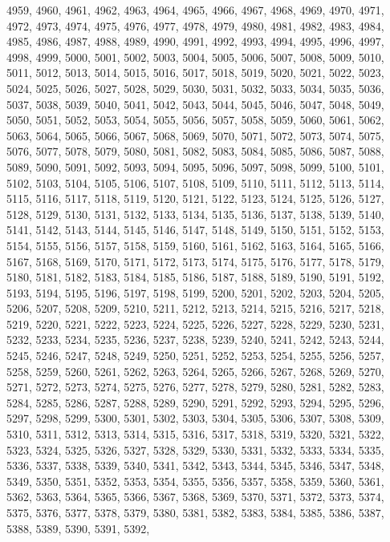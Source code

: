 4959,
4960,
4961,
4962,
4963,
4964,
4965,
4966,
4967,
4968,
4969,
4970,
4971,
4972,
4973,
4974,
4975,
4976,
4977,
4978,
4979,
4980,
4981,
4982,
4983,
4984,
4985,
4986,
4987,
4988,
4989,
4990,
4991,
4992,
4993,
4994,
4995,
4996,
4997,
4998,
4999,
5000,
5001,
5002,
5003,
5004,
5005,
5006,
5007,
5008,
5009,
5010,
5011,
5012,
5013,
5014,
5015,
5016,
5017,
5018,
5019,
5020,
5021,
5022,
5023,
5024,
5025,
5026,
5027,
5028,
5029,
5030,
5031,
5032,
5033,
5034,
5035,
5036,
5037,
5038,
5039,
5040,
5041,
5042,
5043,
5044,
5045,
5046,
5047,
5048,
5049,
5050,
5051,
5052,
5053,
5054,
5055,
5056,
5057,
5058,
5059,
5060,
5061,
5062,
5063,
5064,
5065,
5066,
5067,
5068,
5069,
5070,
5071,
5072,
5073,
5074,
5075,
5076,
5077,
5078,
5079,
5080,
5081,
5082,
5083,
5084,
5085,
5086,
5087,
5088,
5089,
5090,
5091,
5092,
5093,
5094,
5095,
5096,
5097,
5098,
5099,
5100,
5101,
5102,
5103,
5104,
5105,
5106,
5107,
5108,
5109,
5110,
5111,
5112,
5113,
5114,
5115,
5116,
5117,
5118,
5119,
5120,
5121,
5122,
5123,
5124,
5125,
5126,
5127,
5128,
5129,
5130,
5131,
5132,
5133,
5134,
5135,
5136,
5137,
5138,
5139,
5140,
5141,
5142,
5143,
5144,
5145,
5146,
5147,
5148,
5149,
5150,
5151,
5152,
5153,
5154,
5155,
5156,
5157,
5158,
5159,
5160,
5161,
5162,
5163,
5164,
5165,
5166,
5167,
5168,
5169,
5170,
5171,
5172,
5173,
5174,
5175,
5176,
5177,
5178,
5179,
5180,
5181,
5182,
5183,
5184,
5185,
5186,
5187,
5188,
5189,
5190,
5191,
5192,
5193,
5194,
5195,
5196,
5197,
5198,
5199,
5200,
5201,
5202,
5203,
5204,
5205,
5206,
5207,
5208,
5209,
5210,
5211,
5212,
5213,
5214,
5215,
5216,
5217,
5218,
5219,
5220,
5221,
5222,
5223,
5224,
5225,
5226,
5227,
5228,
5229,
5230,
5231,
5232,
5233,
5234,
5235,
5236,
5237,
5238,
5239,
5240,
5241,
5242,
5243,
5244,
5245,
5246,
5247,
5248,
5249,
5250,
5251,
5252,
5253,
5254,
5255,
5256,
5257,
5258,
5259,
5260,
5261,
5262,
5263,
5264,
5265,
5266,
5267,
5268,
5269,
5270,
5271,
5272,
5273,
5274,
5275,
5276,
5277,
5278,
5279,
5280,
5281,
5282,
5283,
5284,
5285,
5286,
5287,
5288,
5289,
5290,
5291,
5292,
5293,
5294,
5295,
5296,
5297,
5298,
5299,
5300,
5301,
5302,
5303,
5304,
5305,
5306,
5307,
5308,
5309,
5310,
5311,
5312,
5313,
5314,
5315,
5316,
5317,
5318,
5319,
5320,
5321,
5322,
5323,
5324,
5325,
5326,
5327,
5328,
5329,
5330,
5331,
5332,
5333,
5334,
5335,
5336,
5337,
5338,
5339,
5340,
5341,
5342,
5343,
5344,
5345,
5346,
5347,
5348,
5349,
5350,
5351,
5352,
5353,
5354,
5355,
5356,
5357,
5358,
5359,
5360,
5361,
5362,
5363,
5364,
5365,
5366,
5367,
5368,
5369,
5370,
5371,
5372,
5373,
5374,
5375,
5376,
5377,
5378,
5379,
5380,
5381,
5382,
5383,
5384,
5385,
5386,
5387,
5388,
5389,
5390,
5391,
5392,
